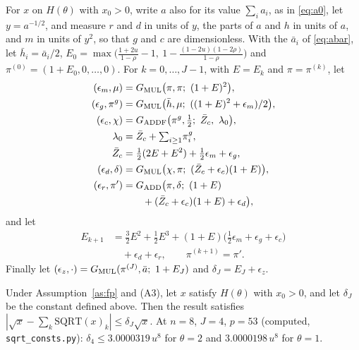 For $x$ on $H(\theta)$ with $x_0 > 0$, write $a$ also for its value $\sum_i
a_i$, as in \eqref{eq:a0}, let $y = a^{-1/2}$, and measure $r$ and $d$ in units of $y$, the parts of $a$ and $h$ in
units of $a$, and $m$ in units of $y^2$, so that $g$ and $c$ are dimensionless. With the $\bar a_i$ of \eqref{eq:abar}, let $\bar
h_i = \bar a_i/2$, $E_0 = \max\bigl(\frac{1+2u}{1-\rho} - 1,\ 1 - \frac{(1-2u)(1-2\rho)}{1-\rho}\bigr)$ and $\pi^{(0)} =
(1+E_0, 0, \dots, 0)$. For $k = 0, \dots, J-1$, with $E = E_k$ and $\pi = \pi^{(k)}$, let
\begin{align*}
(\epsilon_m, \mu) &= G_{\rm MUL}\bigl(\pi, \pi;\ (1+E)^2\bigr), \\
(\epsilon_g, \pi^g) &= G_{\rm MUL}\bigl(\bar h, \mu;\ ((1+E)^2 + \epsilon_m)/2\bigr), \\
(\epsilon_c, \chi) &= G_{\rm ADDF}\bigl(\pi^g, \tfrac12;\ \bar Z_c,\ \lambda_0\bigr), \\
\lambda_0 &= \bar Z_c + {\textstyle\sum_{i \ge 1}}\pi^g_i, \\
\bar Z_c &= \tfrac12(2E + E^2) + \tfrac12\epsilon_m + \epsilon_g, \\
(\epsilon_d, \delta) &= G_{\rm MUL}\bigl(\chi, \pi;\ (\bar Z_c + \epsilon_c)(1+E)\bigr), \\
(\epsilon_r, \pi') &= G_{\rm ADD}\bigl(\pi, \delta;\ (1+E) \\
&\qquad + (\bar Z_c + \epsilon_c)(1+E) + \epsilon_d\bigr),
\end{align*}
and let
\begin{align*}
E_{k+1} &= \tfrac32E^2 + \tfrac12E^3 + (1+E)\bigl(\tfrac12\epsilon_m + \epsilon_g + \epsilon_c\bigr) \\
&\quad + \epsilon_d + \epsilon_r, \qquad \pi^{(k+1)} = \pi'.
\end{align*}
Finally let $(\epsilon_z, \cdot) = G_{\rm MUL}(\pi^{(J)}, \bar a;\ 1 + E_J)$ and $\delta_J = E_J + \epsilon_z$.

\begin{theorem}\label{thm:t7}
Under Assumption~\ref{as:fp} and (A3), let $x$ satisfy $H(\theta)$ with $x_0 > 0$, and let $\delta_J$ be the constant
defined above. Then the result
satisfies $|\sqrt x - \sum_k \mathrm{SQRT}(x)_k| \le \delta_J\sqrt x$. At $n = 8$, $J = 4$, $p = 53$ (computed, \texttt{sqrt\_consts.py}): $\delta_4 \le
3.0000319\,u^8$ for $\theta = 2$ and $3.0000198\,u^8$ for $\theta = 1$.
\end{theorem}

